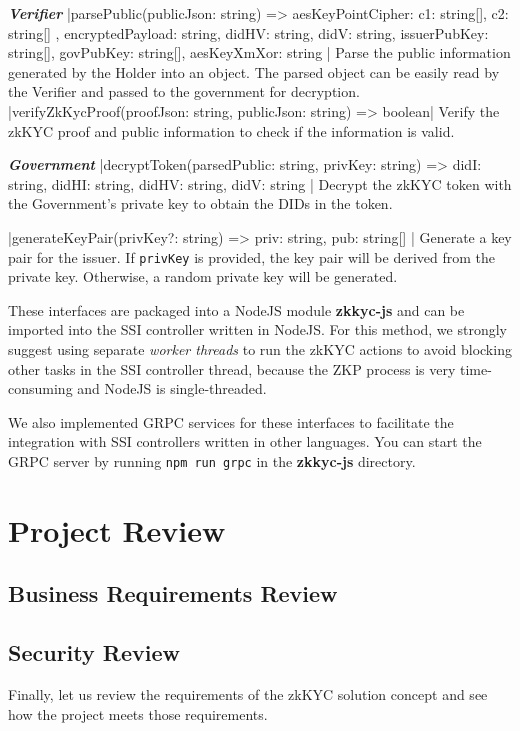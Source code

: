 \documentclass[
]{report}
\begin{document}
\textit{\textbf{Verifier}}
|parsePublic(publicJson: string) => { aesKeyPointCipher: { c1: string[], c2: string[] }, encryptedPayload: string, didHV: string, didV: string, issuerPubKey: string[], govPubKey: string[], aesKeyXmXor: string }|
Parse the public information generated by the Holder into an object.
The parsed object can be easily read by the Verifier and passed to the
government for decryption.
|verifyZkKycProof(proofJson: string, publicJson: string) => boolean|
Verify the zkKYC proof and public information to check if the information is valid.

\textit{\textbf{Government}}
|decryptToken(parsedPublic: string, privKey: string) => { didI: string, didHI: string, didHV: string, didV: string }|
Decrypt the zkKYC token with the Government's private key to obtain
the DIDs in the token.

|generateKeyPair(privKey?: string) => { priv: string, pub: string[] }|
Generate a key pair for the issuer. If \texttt{privKey} is provided,
the key pair will be derived from the private key. Otherwise, a random
private key will be generated.

These interfaces are packaged into a NodeJS module \textbf{zkkyc-js} and
can be imported into the SSI controller written in NodeJS. For this
method, we strongly suggest using separate \emph{worker threads} to run
the zkKYC actions to avoid blocking other tasks in the SSI controller
thread, because the ZKP process is very time-consuming and NodeJS is
single-threaded.

We also implemented GRPC services for these interfaces to facilitate the
integration with SSI controllers written in other languages. You can
start the GRPC server by running \texttt{npm\ run\ grpc} in the
\textbf{zkkyc-js} directory.

\chapter{Project Review}
\section{Business Requirements Review}
\section{Security Review}

Finally, let us review the requirements of the zkKYC solution concept
and see how the project meets those requirements.
\end{document}
